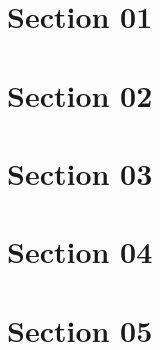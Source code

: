 \section{Section 01}
\lipsum[1]

\section{Section 02}
\lipsum[1]

\section{Section 03}
\lipsum[1]

\section{Section 04}
\lipsum[1]

\section{Section 05}
\lipsum[1]
